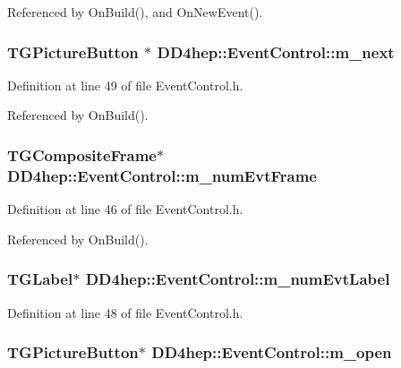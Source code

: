 Referenced by OnBuild(), and OnNewEvent().\hypertarget{class_d_d4hep_1_1_event_control_a238b8108eaa10db3e1b50872795cd9a6}{
\subsubsection[{m\_\-next}]{\setlength{\rightskip}{0pt plus 5cm}TGPictureButton $\ast$ {\bf DD4hep::EventControl::m\_\-next}}}
\label{class_d_d4hep_1_1_event_control_a238b8108eaa10db3e1b50872795cd9a6}


Definition at line 49 of file EventControl.h.

Referenced by OnBuild().\hypertarget{class_d_d4hep_1_1_event_control_a0c4a8e3502931ab1b993054ef87942c7}{
\subsubsection[{m\_\-numEvtFrame}]{\setlength{\rightskip}{0pt plus 5cm}TGCompositeFrame$\ast$ {\bf DD4hep::EventControl::m\_\-numEvtFrame}}}
\label{class_d_d4hep_1_1_event_control_a0c4a8e3502931ab1b993054ef87942c7}


Definition at line 46 of file EventControl.h.

Referenced by OnBuild().\hypertarget{class_d_d4hep_1_1_event_control_aa88e023fadd68daabea42dad9aa4cbe6}{
\subsubsection[{m\_\-numEvtLabel}]{\setlength{\rightskip}{0pt plus 5cm}TGLabel$\ast$ {\bf DD4hep::EventControl::m\_\-numEvtLabel}}}
\label{class_d_d4hep_1_1_event_control_aa88e023fadd68daabea42dad9aa4cbe6}


Definition at line 48 of file EventControl.h.\hypertarget{class_d_d4hep_1_1_event_control_ae2a938df9e309454c1170c23c69a4214}{
\subsubsection[{m\_\-open}]{\setlength{\rightskip}{0pt plus 5cm}TGPictureButton$\ast$ {\bf DD4hep::EventControl::m\_\-open}}}
\label{class_d_d4hep_1_1_event_control_ae2a938df9e309454c1170c23c69a4214}


